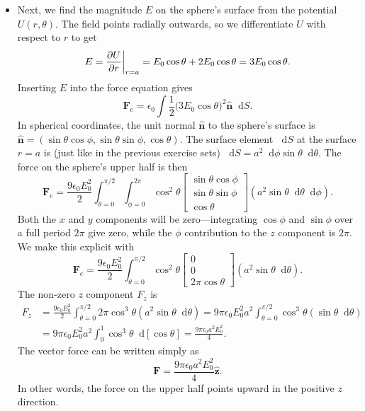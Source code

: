 \documentclass[11pt, a4paper]{article}
\newcommand{\diff}{\mathop{}\!\mathrm{d}} %
\renewcommand{\vec}[1]{\bm{#1}} %
\newcommand{\uvec}[1]{\hat{\vec{#1}}} %
\newcommand{\ee}{\epsilon_{0}}  %
\begin{document}
\begin{itemize}
	\item Next, we find the magnitude $ E $ on the sphere's surface from the potential $ U(r, \theta) $. The field points radially outwards, so we differentiate $ U $ with respect to $ r $ to get
	\begin{equation*}
		E = \pdv{U}{r} \bigg |_{r = a} = E_{0} \cos \theta + 2 E_{0} \cos \theta = 3E_{0} \cos \theta.
	\end{equation*}
	Inserting $ E $ into the force equation gives
	\begin{equation*}
		\vec{F}_{e} = \ee \int \frac{1}{2}\big(3E_{0} \cos \theta\big)^{2} \uvec{n} \diff S.
	\end{equation*}
	In spherical coordinates, the unit normal $ \uvec{n} $ to the sphere's surface is $ \uvec{n} = (\sin \theta \cos \phi, \sin \theta \sin \phi, \cos \theta) $. The surface element $ \diff S $ at the surface $ r = a $ is (just like in the previous exercise sets) $ \diff S = a^{2} \diff \phi \sin \theta \diff \theta $. The force on the sphere's upper half is then
	\begin{equation*}
		\vec{F}_{e} = \frac{9\ee E_{0}^{2}}{2} \int_{\theta = 0}^{\pi/2}\int_{\phi = 0}^{2\pi} \cos^{2} \theta 
		\begin{bmatrix}
			\sin \theta \cos \phi\\
			\sin \theta \sin \phi\\
			\cos \theta
		\end{bmatrix}
		(a^{2} \sin \theta \diff \theta \diff \phi).
	\end{equation*}
	Both the $ x $ and $ y $ components will be zero---integrating $ \cos \phi $ and $ \sin \phi $ over a full period $ 2 \pi $ give zero, while the $ \phi $ contribution to the $ z $ component is $ 2\pi $.  We make this explicit with
	\begin{equation*}
		\vec{F}_{e} = \frac{9\ee E_{0}^{2}}{2} \int_{\theta = 0}^{\pi/2}\cos^{2} \theta 
		\begin{bmatrix}
			0\\
			0\\
			2\pi \cos \theta 
		\end{bmatrix}
		(a^{2} \sin \theta \diff \theta) .
	\end{equation*}
	The non-zero $ z $ component $ F_{z} $ is 
	\begin{align*}
		F_{z} &= \frac{9\ee E_{0}^{2}}{2} \int_{\theta = 0}^{\pi/2}2\pi \cos^{3} \theta (a^{2} \sin \theta \diff \theta) = 9\pi\ee E_{0}^{2}a^{2} \int_{\theta = 0}^{\pi/2} \cos^{3} \theta (\sin \theta \diff \theta)\\
		& =  9\pi\ee E_{0}^{2}a^{2} \int_{0}^{1} \cos^{3} \theta \diff [\cos \theta] = \frac{9\pi\ee a^{2} E_{0}^{2}}{4}.
	\end{align*}
	The vector force can be written simply as
	\begin{equation*}
		\vec{F} = \frac{9\pi\ee a^{2} E_{0}^{2}}{4} \uvec{z}.
	\end{equation*}
	In other words, the force on the upper half points upward in the positive $ z $ direction.	
	
\end{itemize}
\end{document}
